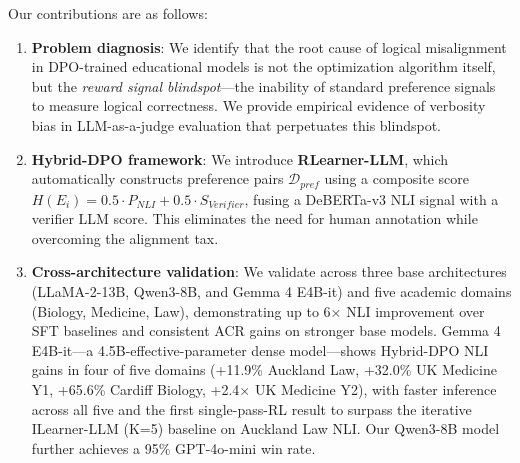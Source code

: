 Our contributions are as follows:
\begin{enumerate}
    \item \textbf{Problem diagnosis}: We identify that the root cause of logical misalignment in DPO-trained educational models is not the optimization algorithm itself, but the \textit{reward signal blindspot}---the inability of standard preference signals to measure logical correctness. We provide empirical evidence of verbosity bias in LLM-as-a-judge evaluation that perpetuates this blindspot.
    \item \textbf{Hybrid-DPO framework}: We introduce \textbf{RLearner-LLM}, which automatically constructs preference pairs $\mathcal{D}_{pref}$ using a composite score $H(E_i) = 0.5 \cdot P_{NLI} + 0.5 \cdot S_{Verifier}$, fusing a DeBERTa-v3 NLI signal with a verifier LLM score. This eliminates the need for human annotation while overcoming the alignment tax.
    \item \textbf{Cross-architecture validation}: We validate across three base architectures (LLaMA-2-13B, Qwen3-8B, and Gemma 4 E4B-it) and five academic domains (Biology, Medicine, Law), demonstrating up to 6$\times$ NLI improvement over SFT baselines and consistent ACR gains on stronger base models. Gemma 4 E4B-it---a 4.5B-effective-parameter dense model---shows Hybrid-DPO NLI gains in four of five domains (+11.9\% Auckland Law, +32.0\% UK Medicine Y1, +65.6\% Cardiff Biology, +2.4$\times$ UK Medicine Y2), with faster inference across all five and the first single-pass-RL result to surpass the iterative ILearner-LLM (K=5) baseline on Auckland Law NLI. Our Qwen3-8B model further achieves a 95\% GPT-4o-mini win rate.
\end{enumerate}
